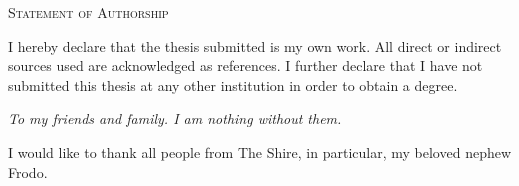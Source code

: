 \documentclass[12pt, openright, oneside, a4paper, english]{abntex2}
\begin{document}
\frenchspacing 

\pretextual

\imprimircapa
\cleardoublepage

\imprimirfolhaderosto





\newpage
\begin{center}
{\ABNTEXchapterfont\Large\textsc{Statement of Authorship}}
\end{center}

\vspace*{1cm}

I hereby declare that the thesis submitted is my own work. All direct or indirect
sources used are acknowledged as references. I further declare that I have not submitted
this thesis at any other institution in order to obtain a degree. \\



\newpage
\begin{dedicatoria}
  \vspace*{\fill}
  \centering
  \noindent
  \textit{ To my friends and family. I am nothing without them.} \vspace*{\fill}
\end{dedicatoria}



\begin{agradecimentos}

I would like to thank all people from The Shire, in particular, my beloved nephew Frodo.

\end{agradecimentos}
\end{document}
